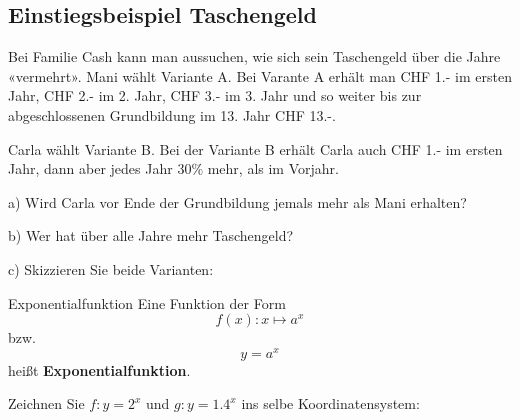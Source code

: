 

\newpage

\subsection{Einstiegsbeispiel Taschengeld}

Bei Familie Cash kann man aussuchen, wie sich sein Taschengeld über
die Jahre «vermehrt». Mani wählt Variante A. Bei Varante A erhält man
CHF 1.- im ersten Jahr, CHF 2.- im 2. Jahr, CHF 3.- im 3. Jahr und so
weiter bis zur abgeschlossenen Grundbildung im 13. Jahr CHF 13.-.

Carla wählt Variante B. Bei der Variante B erhält Carla auch CHF 1.-
im ersten Jahr, dann aber jedes Jahr 30\% mehr, als im Vorjahr.

a) Wird Carla vor Ende der Grundbildung jemals mehr als Mani erhalten?


b) Wer hat über alle Jahre mehr Taschengeld?


c) Skizzieren Sie beide Varianten:





\newpage
\begin{definition}{Exponentialfunktion}{}
  Eine Funktion der Form $$f(x): x \mapsto a^x$$
  bzw. $$y = a^x$$
  heißt \textbf{Exponentialfunktion}.
\end{definition}

Zeichnen Sie $f: y=2^x$ und $g: y=1.4^x$ ins selbe Koordinatensystem:





